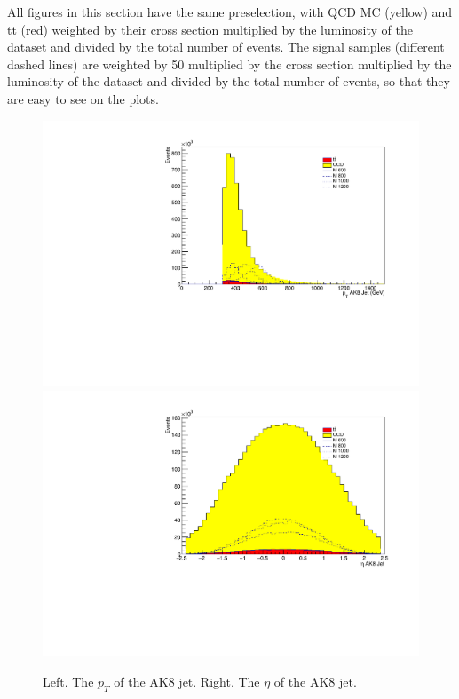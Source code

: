 All figures in this section have the same preselection, with QCD MC (yellow) and tt (red) weighted by their cross section multiplied by the luminosity of the dataset and divided by the total number of events. The signal samples (different dashed lines) are weighted by 50 multiplied by the cross section multiplied by the luminosity of the dataset and divided by the total number of events, so that they are easy to see on the plots. 

\begin{figure}[thb!]
\begin{center}
\includegraphics[scale=0.34]{F5/shapeptFJ.pdf}
\includegraphics[scale=0.34]{F5/shapeetaFJ.pdf}\\
\end{center}
\caption{Left. The $p_{T}$ of the AK8 jet. Right. The $\eta$ of the AK8 jet.}
\label{fig:AK8pteta}
\end{figure} 


